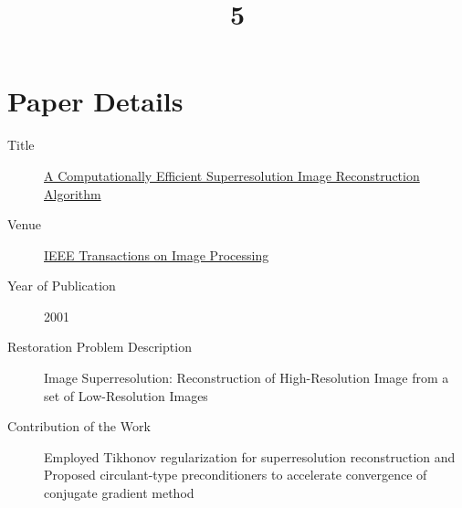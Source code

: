 \documentclass[a4paper, landscape]{article}
\title{5}
\date{}
\begin{document}
\maketitle
\section{Paper Details}
\begin{description}
    \item[Title] \href{https://ieeexplore.ieee.org/document/913592}{A Computationally Efficient Superresolution Image Reconstruction Algorithm}
    \item[Venue] \href{https://ieeexplore.ieee.org/xpl/RecentIssue.jsp?punumber=83}{IEEE Transactions on Image Processing}
    \item[Year of Publication] 2001
    \item[Restoration Problem Description] Image Superresolution: Reconstruction of High-Resolution Image from a set of Low-Resolution Images
    \item[Contribution of the Work] Employed Tikhonov regularization for superresolution reconstruction and\\Proposed circulant-type preconditioners to accelerate convergence of conjugate gradient method
\end{description}
\end{document}
